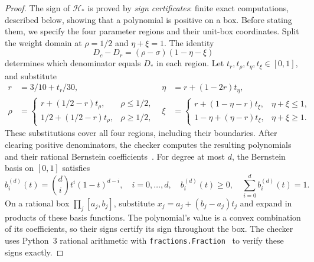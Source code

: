 \documentclass[11pt]{article}
\theoremstyle{remark}
\theoremstyle{plain}
\begin{document}
\begin{proof}
The sign of $\mathcal H_*$ is proved by \emph{sign certificates}:
finite exact computations, described below, showing that a
polynomial is positive on a box. Before stating them, we specify the
four parameter regions and their unit-box coordinates. Split the weight domain
at $\rho=1/2$ and $\eta+\xi=1$. The identity
\begin{equation}
 D_c-D_r=(\rho-\sigma)(1-\eta-\xi)
 \label{eq:app-denominator-order}
\end{equation}
determines which denominator equals $D_*$ in each region.
Let $t_r,t_\rho,t_\eta,t_\xi\in[0,1]$, and substitute
\begin{equation}
 \begin{aligned}
 r&=3/10+t_r/30,&
 \eta&=r+(1-2r)t_\eta,\\
 \rho&=
 \begin{cases}
 r+(1/2-r)t_\rho,&\rho\le1/2,\\
 1/2+(1/2-r)t_\rho,&\rho\ge1/2,
 \end{cases}
 &
 \xi&=
 \begin{cases}
 r+(1-\eta-r)t_\xi,&\eta+\xi\le1,\\
 1-\eta+(\eta-r)t_\xi,&\eta+\xi\ge1.
 \end{cases}
 \end{aligned}
 \label{eq:app-g-certificate-coordinates}
\end{equation}
These substitutions cover all four regions, including their
boundaries. After clearing positive denominators, the checker
computes the resulting polynomials and their rational
Bernstein coefficients~\cite{garloff1986}. For degree at most $d$,
the Bernstein basis on $[0,1]$ satisfies
\begin{equation}
 b_i^{(d)}(t)=\binom di t^i(1-t)^{d-i},\quad i=0,\ldots,d,\quad
 b_i^{(d)}(t)\ge0,\quad\sum_{i=0}^d b_i^{(d)}(t)=1.
 \label{eq:bernstein-basis}
\end{equation}
On a rational box $\prod_j[a_j,b_j]$, substitute
$x_j=a_j+(b_j-a_j)t_j$ and expand in products of these basis
functions. The polynomial's value is a convex combination of its
coefficients, so their signs certify its sign throughout the box.
The checker uses Python~3 rational arithmetic with
\nolinkurl{fractions.Fraction}~\cite{python3} to verify these signs
exactly.


\end{proof}
\end{document}
